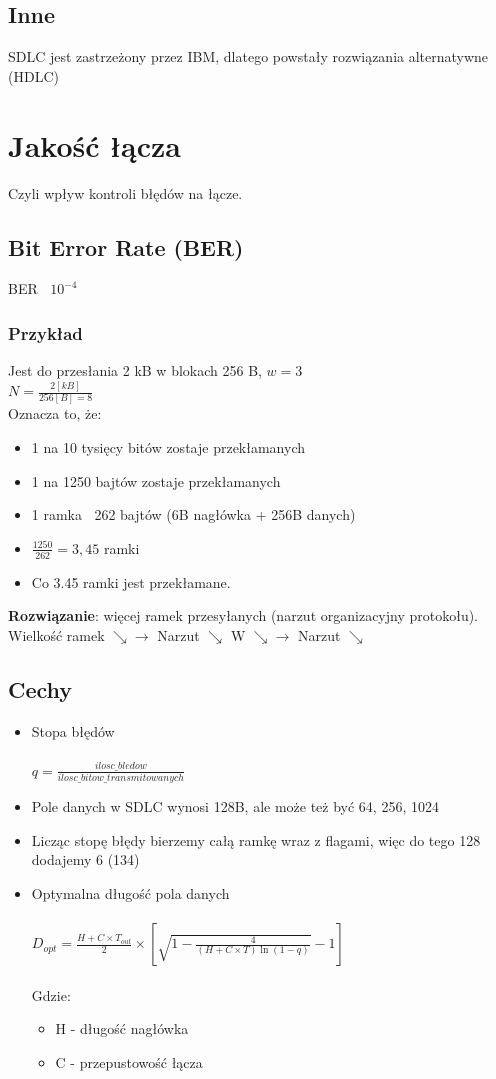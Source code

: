 \documentclass[a4paper,twoside]{article}
\begin{document}
	\subsection{Inne}
		SDLC jest zastrzeżony przez IBM, dlatego powstały rozwiązania alternatywne (HDLC)
	
\section{Jakość łącza}
Czyli wpływ kontroli błędów na łącze.\\
\subsection{Bit Error Rate (BER)}
BER $ ~ $ $ 10^{-4} $ \\
\subsubsection{Przykład}
Jest do przesłania 2 kB w blokach 256 B, $ w = 3 $\\
$ N = \frac{2[kB]}{256[B]=8} $\\
Oznacza to, że:
\begin{itemize}
	\item 1 na 10 tysięcy bitów zostaje przekłamanych
	\item 1 na 1250 bajtów zostaje przekłamanych
	\item 1 ramka $ ~ $ 262 bajtów (6B nagłówka + 256B danych)
	\item $ \frac{1250}{262}=3,45 $ ramki
	\item Co 3.45 ramki jest przekłamane.
\end{itemize}
\textbf{Rozwiązanie}: więcej ramek przesyłanych (narzut organizacyjny protokołu).\\
Wielkość ramek $ \searrow \rightarrow $ Narzut $ \searrow $ W $ \searrow \rightarrow $ Narzut $ \searrow $
\subsection{Cechy}
\begin{itemize}
	\item Stopa błędów\\\\$ q=\frac{ilosc\_bledow}{ilosc\_bitow\_transmitowanych} $
	\item Pole danych w SDLC wynosi 128B, ale może też być 64, 256, 1024
	\item Licząc stopę błędy bierzemy całą ramkę wraz z flagami, więc do tego 128 dodajemy 6 (134)
	\item Optymalna długość pola danych\\\\$ D_{opt}=\frac{H+C\times{T_{out}}}{2}\times  [\sqrt{1-\frac{4}{(H+C\times{T})\ln{(1-q)}}}-1] $\\\\Gdzie:
		\begin{itemize}
			\item H - długość nagłówka
			\item C - przepustowość łącza
		\end{itemize}
\end{itemize}
\end{document}
